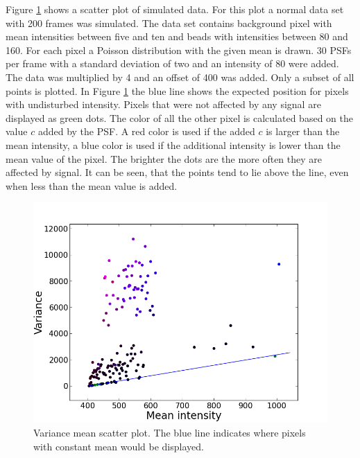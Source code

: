 Figure \ref{simulatedScatter} shows a scatter plot of simulated data. For this plot a normal data set with 200 frames was simulated. The data set contains background pixel with mean intensities between five and ten and beads with intensities between 80 and 160. For each pixel a Poisson distribution with the given mean is drawn. 30 PSFs per frame with a standard deviation of two and an intensity of 80 were added. The data was multiplied by 4 and an offset of 400 was added. Only a subset of all points is plotted. In Figure \ref{simulatedScatter} the blue line shows the expected position for pixels with undisturbed intensity. Pixels that were not affected by any signal are displayed as green dots. The color of all the other pixel is calculated based on the value $c$ added by the PSF. A red color is used if the added $c$ is larger than the mean intensity, a blue color is used if the additional intensity is lower than the mean value of the pixel. The brighter the dots are the more often they are affected by signal. It can be seen, that the points tend to lie above the line, even when less than the mean value is added.
\begin{figure}
\centering
\includegraphics[width = .7\textwidth]{pictures/scatterplot_psfint_2000intmax_80_resx_150psfw_2.png}
\caption{Variance mean scatter plot. The blue line indicates where pixels with constant mean would be displayed.}\label{simulatedScatter}
\end{figure}

